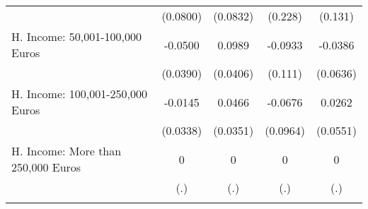 {\begin{tabular}{l*{4}{c}}
            &    (0.0800)         &    (0.0832)         &     (0.228)         &     (0.131)         \\
[1em]
H. Income: 50,001-100,000 Euros&     -0.0500         &      0.0989\sym{*}  &     -0.0933         &     -0.0386         \\
            &    (0.0390)         &    (0.0406)         &     (0.111)         &    (0.0636)         \\
[1em]
H. Income: 100,001-250,000 Euros&     -0.0145         &      0.0466         &     -0.0676         &      0.0262         \\
            &    (0.0338)         &    (0.0351)         &    (0.0964)         &    (0.0551)         \\
[1em]
H. Income: More than 250,000 Euros&           0         &           0         &           0         &           0         \\
            &         (.)         &         (.)         &         (.)         &         (.)         \\
\hline\hline
{}\\
\end{tabular}
}
